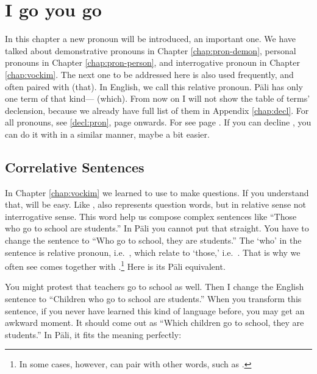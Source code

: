 \chapter{I go  you go}\label{chap:yata}

In this chapter a new pronoun will be introduced, an important one. We have talked about demonstrative pronouns in Chapter \ref{chap:pron-demon}, personal pronouns in Chapter \ref{chap:pron-person}, and interrogative pronoun in Chapter \ref{chap:vockim}. The next one to be addressed here is also used frequently, and often paired with  (that). In English, we call this relative pronoun. P\=ali has only one term of that kind--- (which). From now on I will not show the table of terms' declension, because we already have full list of them in Appendix \ref{chap:decl}. For all pronouns, see \ref{decl:pron}, page \pageref{decl:pron} onwards. For  see page \pageref{decl:ya}. If you can decline , you can do it with  in a similar manner, maybe a bit easier.

{}
\section*{Correlative Sentences}

In Chapter \ref{chap:vockim} we learned to use  to make questions. If you understand that,  will be easy. Like ,  also represents question words, but in relative sense not interrogative sense. This word help us compose complex sentences like ``Those who go to school are students.'' In P\=ali you cannot put that straight. You have to change the sentence to ``Who go to school, they are students.'' The `who' in the sentence is relative pronoun, i.e.\ , which relate to `those,' i.e.\ . That is why we often see  comes together with .\footnote{In some cases, however,  can pair with other words, such as .} Here is its P\=ali equivalent.


You might protest that teachers go to school as well. Then I change the English sentence to ``Children who go to school are students.'' When you transform this sentence, if you never have learned this kind of language before, you may get an awkward moment. It should come out as ``Which children go to school, they are students.'' In P\=ali, it fits the meaning perfectly:


